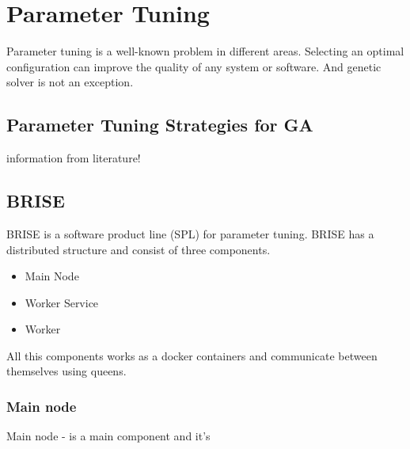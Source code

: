 \chapter{Parameter Tuning}\label{tuning}

Parameter tuning is a well-known problem in different areas.
Selecting an optimal configuration can improve the quality of any system or software.
And genetic solver is not an exception.

\section{Parameter Tuning Strategies for GA}
	information from literature!
\section{BRISE}
	BRISE is a software product line (SPL) for parameter tuning.
BRISE has a distributed structure and consist of three components.
\begin{itemize}
	\item Main Node
	\item Worker Service
	\item Worker
\end{itemize}
All this components works as a docker containers and communicate between themselves using queens. 

\subsection{Main node}
	Main node - is a main component and it's 